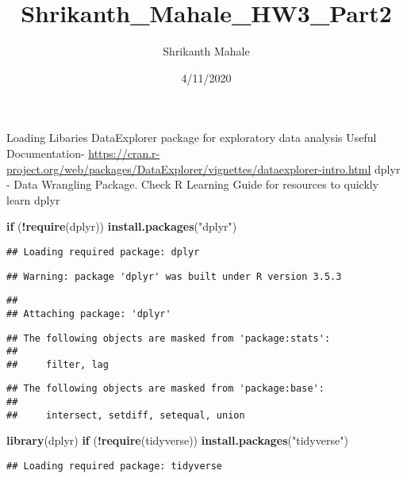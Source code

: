 \documentclass[]{article}
\title{Shrikanth\_Mahale\_HW3\_Part2}
\author{Shrikanth Mahale}
\date{4/11/2020}
\newenvironment{Shaded}{\begin{snugshade}}{\end{snugshade}}
\newcommand{\KeywordTok}[1]{\textcolor[rgb]{0.13,0.29,0.53}{\textbf{#1}}}
\newcommand{\StringTok}[1]{\textcolor[rgb]{0.31,0.60,0.02}{#1}}
\newcommand{\ControlFlowTok}[1]{\textcolor[rgb]{0.13,0.29,0.53}{\textbf{#1}}}
\newcommand{\OperatorTok}[1]{\textcolor[rgb]{0.81,0.36,0.00}{\textbf{#1}}}
\newcommand{\NormalTok}[1]{#1}
\begin{document}
\maketitle

Loading Libaries DataExplorer package for exploratory data analysis
Useful Documentation-
\url{https://cran.r-project.org/web/packages/DataExplorer/vignettes/dataexplorer-intro.html}
dplyr - Data Wrangling Package. Check R Learning Guide for resources to
quickly learn dplyr

\begin{Shaded}
\begin{Highlighting}[]
\ControlFlowTok{if}\NormalTok{ (}\OperatorTok{!}\KeywordTok{require}\NormalTok{(dplyr)) }\KeywordTok{install.packages}\NormalTok{(}\StringTok{"dplyr"}\NormalTok{)}
\end{Highlighting}
\end{Shaded}

\begin{verbatim}
## Loading required package: dplyr
\end{verbatim}

\begin{verbatim}
## Warning: package 'dplyr' was built under R version 3.5.3
\end{verbatim}

\begin{verbatim}
## 
## Attaching package: 'dplyr'
\end{verbatim}

\begin{verbatim}
## The following objects are masked from 'package:stats':
## 
##     filter, lag
\end{verbatim}

\begin{verbatim}
## The following objects are masked from 'package:base':
## 
##     intersect, setdiff, setequal, union
\end{verbatim}

\begin{Shaded}
\begin{Highlighting}[]
\KeywordTok{library}\NormalTok{(dplyr)}
\ControlFlowTok{if}\NormalTok{ (}\OperatorTok{!}\KeywordTok{require}\NormalTok{(tidyverse)) }\KeywordTok{install.packages}\NormalTok{(}\StringTok{"tidyverse"}\NormalTok{)}
\end{Highlighting}
\end{Shaded}

\begin{verbatim}
## Loading required package: tidyverse
\end{verbatim}
\end{document}
